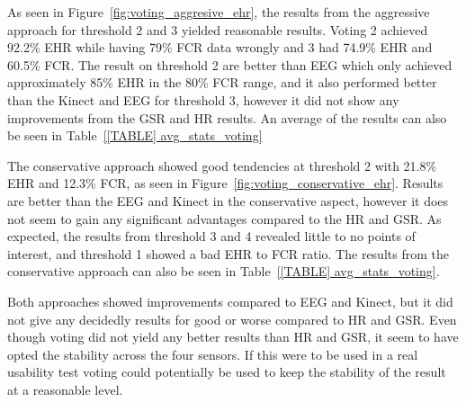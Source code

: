 As seen in Figure~\ref{fig:voting_aggresive_ehr}, the results from the aggressive approach for threshold 2 and 3 yielded reasonable results.
Voting 2 achieved 92.2\% EHR while having 79\% FCR data wrongly and 3 had 74.9\% EHR and 60.5\% FCR.
The result on threshold 2 are better than EEG which only achieved approximately 85\% EHR in the 80\% FCR range, and it
also performed better than the Kinect and EEG for threshold 3, however it did not show any improvements from the GSR and
HR results.
An average of the results can also be seen in Table~\ref{[TABLE] avg_stats_voting}

The conservative approach showed good tendencies at threshold 2 with 21.8\% EHR and 12.3\% FCR, as seen in Figure~\ref{fig:voting_conservative_ehr}.
Results are better than the EEG and Kinect in the conservative aspect, however it does not seem to gain any significant advantages compared to the HR and GSR.
As expected, the results from threshold 3 and 4 revealed little to no points of interest, and threshold 1 showed a bad EHR to FCR ratio. 
The results from the conservative approach can also be seen in Table~\ref{[TABLE] avg_stats_voting}.

Both approaches showed improvements compared to EEG and Kinect, but it did not give any decidedly results for good or worse compared
to HR and GSR.
Even though voting did not yield any better results than HR and GSR, it seem to have opted the stability across the four sensors. If this were to be used in a real usability test voting could potentially be used to keep the stability of the result at a reasonable level. 
